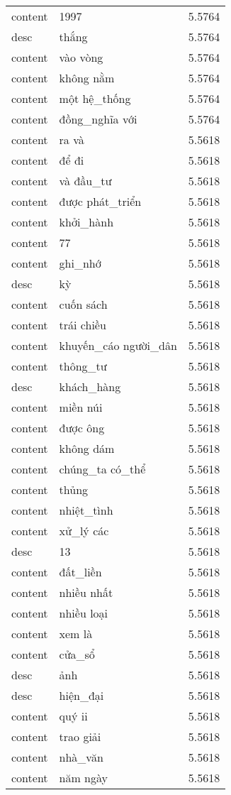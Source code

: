 \documentclass{article}
\begin{document}
\begin{tabular}{lll}
content & 1997 & 5.5764\\
desc & thắng & 5.5764\\
content & vào vòng & 5.5764\\
content & không nằm & 5.5764\\
content & một hệ\_thống & 5.5764\\
content & đồng\_nghĩa với & 5.5764\\
content & ra và & 5.5618\\
content & để đi & 5.5618\\
content & và đầu\_tư & 5.5618\\
content & được phát\_triển & 5.5618\\
content & khởi\_hành & 5.5618\\
content & 77 & 5.5618\\
content & ghi\_nhớ & 5.5618\\
desc & kỳ & 5.5618\\
content & cuốn sách & 5.5618\\
content & trái chiều & 5.5618\\
content & khuyến\_cáo người\_dân & 5.5618\\
content & thông\_tư & 5.5618\\
desc & khách\_hàng & 5.5618\\
content & miền núi & 5.5618\\
content & được ông & 5.5618\\
content & không dám & 5.5618\\
content & chúng\_ta có\_thể & 5.5618\\
content & thủng & 5.5618\\
content & nhiệt\_tình & 5.5618\\
content & xử\_lý các & 5.5618\\
desc & 13 & 5.5618\\
content & đất\_liền & 5.5618\\
content & nhiều nhất & 5.5618\\
content & nhiều loại & 5.5618\\
content & xem là & 5.5618\\
content & cửa\_sổ & 5.5618\\
desc & ảnh & 5.5618\\
desc & hiện\_đại & 5.5618\\
content & quý ii & 5.5618\\
content & trao giải & 5.5618\\
content & nhà\_văn & 5.5618\\
content & năm ngày & 5.5618\\

\end{tabular}
\end{document}
